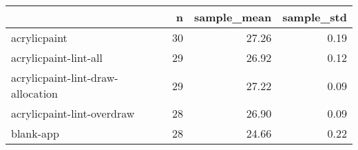 \begin{tabular}{lrrr}
\toprule
{} &   n &  sample\_mean &  sample\_std \\
\midrule
acrylicpaint                      &  30 &        27.26 &        0.19 \\
acrylicpaint-lint-all             &  29 &        26.92 &        0.12 \\
acrylicpaint-lint-draw-allocation &  29 &        27.22 &        0.09 \\
acrylicpaint-lint-overdraw        &  28 &        26.90 &        0.09 \\
blank-app                         &  28 &        24.66 &        0.22 \\
\bottomrule
\end{tabular}

